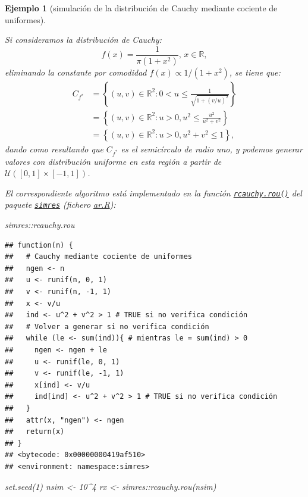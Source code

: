 \documentclass[
]{book}
\newenvironment{Shaded}{\begin{snugshade}}{\end{snugshade}}
\newcommand{\DecValTok}[1]{\textcolor[rgb]{0.00,0.00,0.81}{#1}}
\newcommand{\FunctionTok}[1]{\textcolor[rgb]{0.00,0.00,0.00}{#1}}
\newcommand{\NormalTok}[1]{#1}
\newcommand{\OtherTok}[1]{\textcolor[rgb]{0.56,0.35,0.01}{#1}}
\newcommand{\SpecialCharTok}[1]{\textcolor[rgb]{0.00,0.00,0.00}{#1}}
\theoremstyle{break}
\newtheorem{example}{Ejemplo}[chapter]
\theoremstyle{nonumberplain}
\begin{document}
\begin{example}[simulación de la distribución de Cauchy mediante cociente de uniformes]
\protect\hypertarget{exm:cauchy-rou}{}\label{exm:cauchy-rou}

Si consideramos la distribución de Cauchy:
\[f(x) = \frac{1}{\pi (1 + x^2)} \text{, } x\in \mathbb{R},\]
eliminando la constante por comodidad \(f(x) \propto 1/(1 + x^2)\), se tiene que:
\[\begin{aligned}
C_{f^{\ast}} & = \left\{ (u, v) \in \mathbb{R}^{2} : 0 <u \leq \frac{1}{\sqrt{1 + (v/u)^2}}  \right\} \\
& = \left\{ (u, v) \in \mathbb{R}^{2} : u > 0, u^2 \leq \frac{u^2}{u^2 + v^2}  \right\} \\
& = \left\{ (u, v) \in \mathbb{R}^{2} : u > 0, u^2 + v^2 \leq 1  \right\}, 
\end{aligned}\]
dando como resultando que \(C_{f^{\ast}}\) es el semicírculo de radio uno, y podemos generar valores con distribución uniforme en esta región a partir de \(\mathcal{U}\left([0,1]\times[-1,1] \right)\).

El correspondiente algoritmo está implementado en la función \href{https://rubenfcasal.github.io/simres/reference/rcauchy.rou.html}{\texttt{rcauchy.rou()}} del paquete \href{https://rubenfcasal.github.io/simres}{\texttt{simres}} (fichero \href{R/ar.R}{\emph{ar.R}}):

\begin{Shaded}
\begin{Highlighting}[]
\NormalTok{simres}\SpecialCharTok{::}\NormalTok{rcauchy.rou}
\end{Highlighting}
\end{Shaded}

\begin{verbatim}
## function(n) {
##   # Cauchy mediante cociente de uniformes
##   ngen <- n
##   u <- runif(n, 0, 1)
##   v <- runif(n, -1, 1)
##   x <- v/u
##   ind <- u^2 + v^2 > 1 # TRUE si no verifica condición
##   # Volver a generar si no verifica condición
##   while (le <- sum(ind)){ # mientras le = sum(ind) > 0
##     ngen <- ngen + le
##     u <- runif(le, 0, 1)
##     v <- runif(le, -1, 1)
##     x[ind] <- v/u
##     ind[ind] <- u^2 + v^2 > 1 # TRUE si no verifica condición
##   }
##   attr(x, "ngen") <- ngen
##   return(x)
## }
## <bytecode: 0x00000000419af510>
## <environment: namespace:simres>
\end{verbatim}

\begin{Shaded}
\begin{Highlighting}[]
\FunctionTok{set.seed}\NormalTok{(}\DecValTok{1}\NormalTok{)}
\NormalTok{nsim }\OtherTok{\textless{}{-}} \DecValTok{10}\SpecialCharTok{\^{}}\DecValTok{4}
\NormalTok{rx }\OtherTok{\textless{}{-}}\NormalTok{ simres}\SpecialCharTok{::}\FunctionTok{rcauchy.rou}\NormalTok{(nsim)}


\end{Highlighting}
\end{Shaded}
\end{example}
\end{document}
